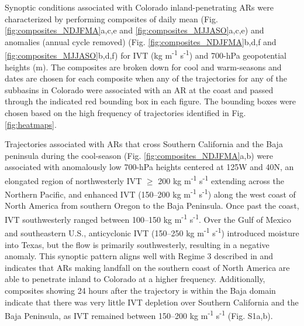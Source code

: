 \documentclass[draft]{agujournal2019}
\begin{document}
Synoptic conditions associated with Colorado inland-penetrating ARs were characterized by performing composites of daily mean (Fig. \ref{fig:composites_NDJFMA}a,c,e and \ref{fig:composites_MJJASO}a,c,e) and anomalies (annual cycle removed) (Fig. \ref{fig:composites_NDJFMA}b,d,f and \ref{fig:composites_MJJASO}b,d,f) for IVT (kg m\textsuperscript{-1} s\textsuperscript{-1}) and 700-hPa geopotential heights (m). The composites are broken down for cool and warm-seasons and dates are chosen for each composite when any of the trajectories for any of the subbasins in Colorado were associated with an AR at the coast and passed through the indicated red bounding box in each figure. The bounding boxes were chosen based on the high frequency of trajectories identified in Fig. \ref{fig:heatmaps}. 

Trajectories associated with ARs that cross Southern California and the Baja peninsula during the cool-season (Fig. \ref{fig:composites_NDJFMA}a,b) were associated with anomalously low 700-hPa heights centered at 125\textdegree W and 40\textdegree N, an elongated region of northwesterly IVT $\geq$ 200 kg m\textsuperscript{-1} s\textsuperscript{-1} extending across the Northern Pacific, and enhanced IVT (150--200 kg m\textsuperscript{-1} s\textsuperscript{-1}) along the west coast of North America from southern Oregon to the Baja Peninsula. Once past the coast, IVT southwesterly ranged between 100--150 kg m\textsuperscript{-1} s\textsuperscript{-1}. Over the Gulf of Mexico and southeastern U.S., anticyclonic IVT (150--250 kg m\textsuperscript{-1} s\textsuperscript{-1}) introduced moisture into Texas, but the flow is primarily southwesterly, resulting in a negative anomaly. This synoptic pattern aligns well with Regime 3 described in  and indicates that ARs making landfall on the southern coast of North America are able to penetrate inland to Colorado at a higher frequency. Additionally, composites showing 24 hours after the trajectory is within the Baja domain indicate that there was very little IVT depletion over Southern California and the Baja Peninsula, as IVT remained between 150--200 kg m\textsuperscript{-1} s\textsuperscript{-1} (Fig. S1a,b). 


\end{document}
